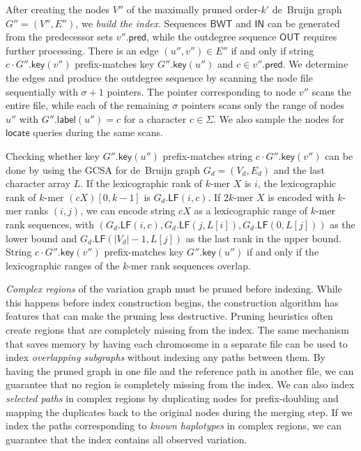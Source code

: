 \documentclass[twoside,leqno,twocolumn]{article}
\newcommand{\abs}[1]{\ensuremath{\lvert #1 \rvert}}
\newcommand{\LF}{\ensuremath{\mathsf{LF}}}
\newcommand{\locate}{\ensuremath{\mathsf{locate}}}
\newcommand{\glabel}{\ensuremath{\mathsf{label}}}
\newcommand{\gpred}{\ensuremath{\mathsf{pred}}}
\newcommand{\gkey}{\ensuremath{\mathsf{key}}}
\newcommand{\kmer}[1]{$#1$\nobreakdash-mer}
\newcommand{\orderk}[1]{order\nobreakdash-$#1$}
\newcommand{\BWT}{\ensuremath{\mathsf{BWT}}}
\newcommand{\bvIN}{\ensuremath{\mathsf{IN}}}
\newcommand{\bvOUT}{\ensuremath{\mathsf{OUT}}}
\begin{document}
After creating the nodes $V''$ of the maximally pruned \orderk{k'} de~Bruijn graph $G'' = (V'', E'')$, we \emph{build the index}. Sequences $\BWT$ and $\bvIN$ can be generated from the predecessor sets $v''.\gpred$, while the outdegree sequence $\bvOUT$ requires further processing. There is an edge $(u'', v'') \in E''$ if and only if string $c \cdot G''.\gkey(v'')$ prefix-matches key $G''.\gkey(u'')$ and $c \in v''.\gpred$. We determine the edges and produce the outdegree sequence by scanning the node file sequentially with $\sigma+1$ pointers. The pointer corresponding to node $v''$ scans the entire file, while each of the remaining $\sigma$ pointers scans only the range of nodes $u''$ with $G''.\glabel(u'') = c$ for a character $c \in \Sigma$. We also sample the nodes for $\locate$ queries during the same scans.

Checking whether key $G''.\gkey(u'')$ prefix-matches string $c \cdot G''.\gkey(v'')$ can be done by using the GCSA for de~Bruijn graph $G_{d} = (V_{d}, E_{d})$ and the last character array $L$. If the lexicographic rank of \kmer{k} $X$ is $i$, the lexicographic rank of \kmer{k} $(cX)[0, k-1]$ is $G_{d}.\LF(i, c)$. If \kmer{2k} $X$ is encoded with \kmer{k} ranks $(i, j)$, we can encode string $cX$ as a lexicographic range of \kmer{k} rank sequences, with $(G_{d}.\LF(i, c), G_{d}.\LF(j, L[i]), G_{d}.\LF(0, L[j]))$ as the lower bound and $G_{d}.\LF(\abs{V_{d}}-1, L[j])$ as the last rank in the upper bound. String $c \cdot G''.\gkey(v'')$ prefix-matches key $G''.\gkey(u'')$ if and only if the lexicographic ranges of the \kmer{k} rank sequences overlap.

\emph{Complex regions} of the variation graph must be pruned before indexing. While this happens before index construction begins, the construction algorithm has features that can make the pruning less destructive. Pruning heuristics often create regions that are completely missing from the index. The same mechanism that saves memory by having each chromosome in a separate file can be used to index \emph{overlapping subgraphs} without indexing any paths between them. By having the pruned graph in one file and the reference path in another file, we can guarantee that no region is completely missing from the index. We can also index \emph{selected paths} in complex regions by duplicating nodes for prefix-doubling and mapping the duplicates back to the original nodes during the merging step. If we index the paths corresponding to \emph{known haplotypes} in complex regions, we can guarantee that the index contains all observed variation.
\end{document}
